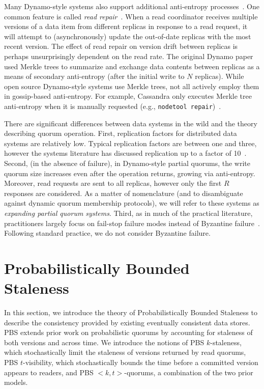 \documentclass{vldb}
\begin{document}
Many Dynamo-style systems also support additional anti-entropy
processes~\cite{nosql}.  One common feature is called \textit{read
  repair}~\cite{dynamo}.  When a read coordinator receives multiple
versions of a data item from different replicas in response to a read
request, it will attempt to (asynchronously) update the out-of-date
replicas with the most recent version.  The effect of read repair on
version drift between replicas is perhaps unsurprisingly dependent on
the read rate.  The original Dynamo paper used Merkle trees to
summarize and exchange data contents between replicas as a means of
secondary anti-entropy (after the initial write to $N$ replicas).
While open source Dynamo-style systems use Merkle trees, not all
actively employ them in gossip-based anti-entropy.  For example,
Cassandra only executes Merkle tree anti-entropy when it is manually
requested (e.g., \texttt{nodetool repair})~\cite{cassandra-merkle}.

There are significant differences between data systems in the wild and
the theory describing quorum operation.  First, replication factors
for distributed data systems are relatively low.  Typical replication
factors are between one and three, however the systems literature has
discussed replication up to a factor of 10~\cite{chain-replication}.
Second, (in the absence of failure), in Dynamo-style partial quorums,
the write quorum size increases even after the operation returns,
growing via anti-entropy.  Moreover, read requests are sent to all
replicas, however only the first $R$ responses are considered.  As a
matter of nomenclature (and to disambiguate against dynamic quorum
membership protocols), we will refer to these systems as
\textit{expanding partial quorum systems}.  Third, as in much of the
practical literature, practitioners largely focus on fail-stop failure
modes instead of Byzantine failure~\cite{birman-byzantine}.
Following standard practice, we do not consider Byzantine failure.

\section{Probabilistically Bounded\\Staleness}
\label{sec:pbs}

In this section, we introduce the theory of Probabilistically Bounded
Staleness to describe the consistency provided by existing eventually
consistent data stores.  PBS extends prior work on
probabilistic quorums by accounting for staleness of both versions and
across time.  We introduce the notions of PBS $k$-staleness, which
stochastically limit the staleness of versions returned by read
quorums, PBS $t$-visibility, which stochastically bounds the time
before a committed version appears to readers, and PBS $<k,
t>$-quorums, a combination of the two prior models.
\end{document}
